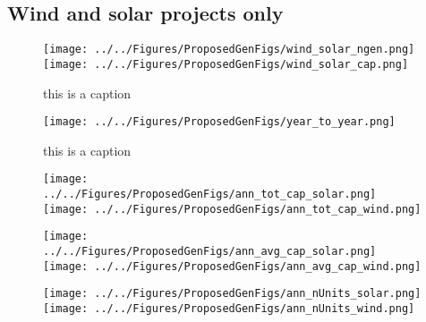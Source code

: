 \documentclass[11pt, oneside]{article}   	%
\begin{document}
\subsection{Wind and solar projects only}
\begin{figure}[ht]
\caption{this is a caption}
\texttt{[image: ../../Figures/ProposedGenFigs/wind\_solar\_ngen.png]}
\texttt{[image: ../../Figures/ProposedGenFigs/wind\_solar\_cap.png]}
\end{figure}

\begin{figure}
\caption{this is a caption}
\texttt{[image: ../../Figures/ProposedGenFigs/year\_to\_year.png]}
\end{figure}










\begin{figure}[ht]
\texttt{[image: ../../Figures/ProposedGenFigs/ann\_tot\_cap\_solar.png]}
\texttt{[image: ../../Figures/ProposedGenFigs/ann\_tot\_cap\_wind.png]}
\end{figure}

\begin{figure}[ht]
\texttt{[image: ../../Figures/ProposedGenFigs/ann\_avg\_cap\_solar.png]}
\texttt{[image: ../../Figures/ProposedGenFigs/ann\_avg\_cap\_wind.png]}
\end{figure}

\begin{figure}[ht]
\texttt{[image: ../../Figures/ProposedGenFigs/ann\_nUnits\_solar.png]}
\texttt{[image: ../../Figures/ProposedGenFigs/ann\_nUnits\_wind.png]}
\end{figure}
\end{document}
